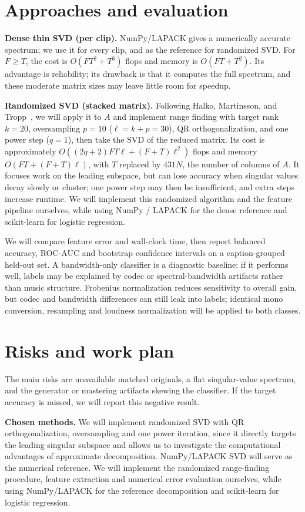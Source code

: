 \documentclass[11pt,a4paper]{article}
\theoremstyle{plain}
\theoremstyle{definition}
\theoremstyle{remark}
\begin{document}
\section{Approaches and evaluation}
\textbf{Dense thin SVD (per clip).} NumPy/LAPACK gives a numerically accurate
spectrum; we use it for every clip, and as the reference for randomized SVD. For $F\geq T$, the cost
is $O(FT^2+T^3)$ flops and memory is $O(FT+T^2)$. Its advantage is reliability;
its drawback is that it computes the full spectrum, and these moderate matrix
sizes may leave little room for speedup.

\textbf{Randomized SVD (stacked matrix).} Following Halko, Martinsson, and
Tropp~\cite{Halko}, we will apply it to $A$ and implement range finding with target rank $k=20$, oversampling $p=10$
($\ell=k+p=30$), QR orthogonalization, and one power step ($q=1$), then take
the SVD of the reduced matrix. Its cost is approximately
$O((2q+2)FT\ell+(F+T)\ell^2)$ flops and memory
$O(FT+(F+T)\ell)$, with $T$ replaced by $431N$, the number of columns of $A$. It focuses work on the leading subspace, but can lose
accuracy when singular values decay slowly or cluster; one power step may then
be insufficient, and extra steps increase runtime. We will implement this
randomized algorithm and the feature pipeline ourselves, while using NumPy /
LAPACK for the dense reference and scikit-learn for logistic regression.

We will compare feature error and wall-clock time, then report balanced accuracy,
ROC-AUC and bootstrap confidence intervals on a caption-grouped held-out set.
A bandwidth-only classifier is a diagnostic baseline: if it performs well,
labels may be explained by codec or spectral-bandwidth artifacts rather than
music structure. Frobenius normalization reduces sensitivity to overall gain,
but codec and bandwidth differences can still leak into labels; identical mono
conversion, resampling and loudness normalization will be applied to both classes.

\section{Risks and work plan}

The main risks are unavailable matched originals, a flat singular-value
spectrum, and the generator or mastering artifacts skewing the classifier.
If the target accuracy is missed, we will report this negative result.

\textbf{Chosen methods.} We will implement randomized SVD with QR
orthogonalization, oversampling and one power iteration, since it directly
targets the leading singular subspace and allows us to investigate the
computational advantages of approximate decomposition. NumPy/LAPACK
SVD will serve as the numerical reference. We will implement the randomized
range-finding procedure, feature extraction and numerical error evaluation
ourselves, while using NumPy/LAPACK for the reference decomposition and
scikit-learn for logistic regression.
\end{document}
